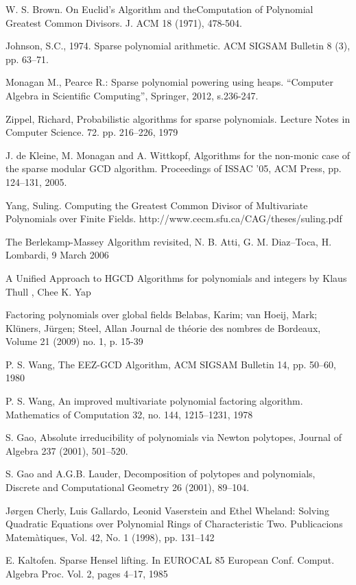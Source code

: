 \documentclass[11pt,reqno]{amsart}
\numberwithin{equation}{section}
\begin{document}
\begin{thebibliography}{99}
 W. S. Brown. On Euclid’s Algorithm and theComputation of
Polynomial Greatest Common Divisors. J. ACM 18 (1971), 478-504.

 Johnson, S.C., 1974. Sparse polynomial arithmetic. ACM SIGSAM
Bulletin 8 (3), pp. 63--71.

 Monagan M., Pearce R.: Sparse polynomial powering using heaps.
“Computer Algebra in Scientific Computing”, Springer, 2012, s.236-247. 

 Zippel, Richard, Probabilistic algorithms for sparse
polynomials. Lecture Notes in Computer Science. 72. pp. 216--226, 1979

  J. de Kleine, M. Monagan and A. Wittkopf, Algorithms for the 
non-monic case of the sparse modular GCD algorithm. Proceedings of ISSAC ’05,
ACM Press, pp. 124--131, 2005.

 Yang, Suling. Computing the Greatest Common Divisor of
Multivariate Polynomials over Finite Fields.
http://www.cecm.sfu.ca/CAG/theses/suling.pdf
	
 The Berlekamp-Massey Algorithm revisited, N. B. Atti, G. M.
Diaz–Toca, H. Lombardi, 9 March 2006
	
 A Unified Approach to HGCD Algorithms for polynomials and
integers by Klaus Thull , Chee K. Yap
	
  Factoring polynomials over global fields Belabas,
Karim; van Hoeij, Mark; Klüners, Jürgen; Steel, Allan Journal de théorie des
nombres de Bordeaux, Volume 21 (2009) no. 1, p. 15-39

 P. S. Wang, The EEZ-GCD Algorithm, ACM SIGSAM Bulletin 14,
pp. 50--60, 1980

 P. S. Wang, An improved multivariate polynomial factoring
algorithm. Mathematics of Computation 32, no. 144, 1215--1231, 1978

 S. Gao, Absolute irreducibility of polynomials via Newton
polytopes, Journal of Algebra
237 (2001), 501--520.

 S. Gao and A.G.B. Lauder, Decomposition of polytopes and
polynomials, Discrete and Computational Geometry 26 (2001), 89--104.

 Jørgen Cherly, Luis Gallardo, Leonid Vaserstein and
Ethel Wheland:  Solving Quadratic Equations over Polynomial Rings of
Characteristic Two. Publicacions Matemàtiques, Vol. 42, No. 1 (1998), pp.
131--142

 E. Kaltofen.  Sparse Hensel lifting.  In EUROCAL 85 European
Conf. Comput. Algebra Proc. Vol. 2, pages 4–17, 1985
\end{thebibliography}
\end{document}
